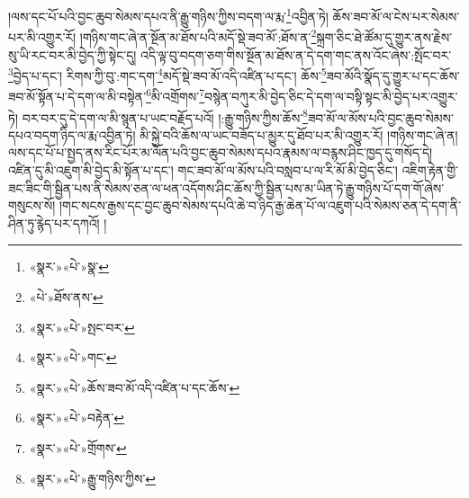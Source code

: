 །ལས་དང་པོ་པའི་བྱང་ཆུབ་སེམས་དཔའ་ནི་རྒྱུ་གཉིས་ཀྱིས་བདག་ལ་རྨ་\footnote{«སྣར་»«པེ་»སྣ་}འབྱིན་ཏེ། ཆོས་ཟབ་མོ་ལ་ངེས་པར་སེམས་པར་མི་འགྱུར་རོ། །གཉིས་གང་ཞེ་ན་སྔོན་མ་ཐོས་པའི་མདོ་སྡེ་ཟབ་མོ་:ཐོས་ན་\footnote{«པེ་»ཐོས་ནས་}སྐྲག་ཅིང་ཐེ་ཚོམ་དུ་གྱུར་ནས་རྗེས་སུ་ཡི་རང་བར་མི་བྱེད་ཀྱི་སྟེང་དུ། འདི་ལྟ་བུ་བདག་ཅག་གིས་སྔོན་མ་ཐོས་ན་དེ་དག་གང་ནས་འོང་ཞེས་:སྤོང་བར་\footnote{«སྣར་»«པེ་»སྤང་བར་}བྱེད་པ་དང་། རིགས་ཀྱི་བུ་:གང་དག་\footnote{«སྣར་»«པེ་»གང་}མདོ་སྡེ་ཟབ་མོ་འདི་འཛིན་པ་དང་། ཆོས་\footnote{«སྣར་»«པེ་»ཆོས་ཟབ་མོ་འདི་འཛིན་པ་དང་ཆོས་}ཟབ་མོའི་སྣོད་དུ་གྱུར་པ་དང་ཆོས་ཟབ་མོ་སྟོན་པ་དེ་དག་ལ་མི་བསྟེན་\footnote{«སྣར་»«པེ་»བརྟེན་}མི་འགྲོགས་\footnote{«སྣར་»«པེ་»གྲོགས་}བསྙེན་བཀུར་མི་བྱེད་ཅིང་དེ་དག་ལ་བསྟི་སྟང་མི་བྱེད་པར་འགྱུར་ཏེ། བར་བར་དུ་དེ་དག་ལ་མི་སྙན་པ་ཡང་བརྗོད་པའོ། །:རྒྱུ་གཉིས་ཀྱིས་ཆོས་\footnote{«སྣར་»«པེ་»རྒྱུ་གཉིས་ཀྱིས་}ཟབ་མོ་ལ་མོས་པའི་བྱང་ཆུབ་སེམས་དཔའ་བདག་ཉིད་ལ་རྨ་འབྱིན་ཏེ། མི་སྐྱེ་བའི་ཆོས་ལ་ཡང་བཟོད་པ་མྱུར་དུ་ཐོབ་པར་མི་འགྱུར་རོ། །གཉིས་གང་ཞེ་ན། ལས་དང་པོ་པ་སྤྱད་ནས་རིང་པོར་མ་ལོན་པའི་བྱང་ཆུབ་སེམས་དཔའ་རྣམས་ལ་བརྙས་ཤིང་ཁྱད་དུ་གསོད་དེ། འཛིན་དུ་མི་འཇུག་མི་བྱེད་མི་སྟོན་པ་དང་། གང་ཟབ་མོ་ལ་མོས་པའི་བསླབ་པ་ལ་རི་མོ་མི་བྱེད་ཅིང་། འཇིག་རྟེན་གྱི་ཟང་ཟིང་གི་སྦྱིན་པས་ནི་སེམས་ཅན་ལ་ཕན་འདོགས་ཤིང་ཆོས་ཀྱི་སྦྱིན་པས་མ་ཡིན་ཏེ་རྒྱུ་གཉིས་པོ་དག་གོ་ཞེས་གསུངས་སོ། །གང་སངས་རྒྱས་དང་བྱང་ཆུབ་སེམས་དཔའི་ཆེ་བ་ཉིད་རྒྱ་ཆེན་པོ་ལ་འཇུག་པའི་སེམས་ཅན་དེ་དག་ནི་ཤིན་ཏུ་རྙེད་པར་དཀའོ། །
